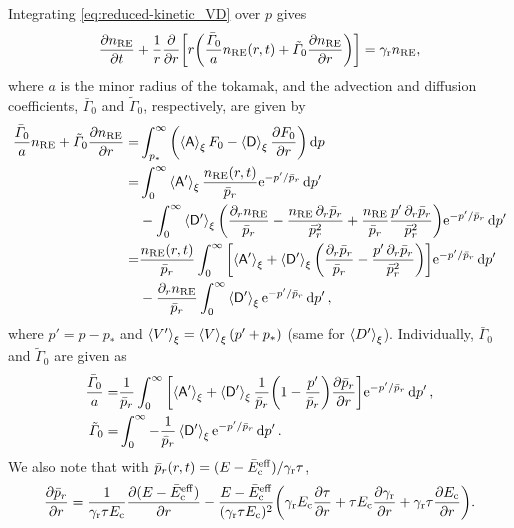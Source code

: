 \documentclass[11pt,a4paper,english
]{article}
\newcommand{\pd}{\ensuremath{\partial}}
\newcommand{\ee}{\mathrm{e}}
\newcommand{\nRE}{\ensuremath{n_{\rm RE}}}
\begin{document}
Integrating \eqref{eq:reduced-kinetic_VD} over $p$ gives
\begin{equation}\label{eq:n_RE}
\pdv{\nRE}{t} + \frac{1}{r}\pdv{r}
\qty[r\qty(\frac{\bar\varGamma_{0}}{a}\nRE(r,t)+\tilde\varGamma_{0}\pdv{\nRE}{r})]
=\gamma_{\rm r}\nRE,
\end{equation}
where $a$ is the minor radius of the tokamak, and the advection and
diffusion coefficients, $\bar\varGamma_{0}$ and $\tilde\varGamma_{0}$,
respectively, are given by
\begin{equation}
\begin{aligned}
\frac{\bar\varGamma_{0}}{a}\nRE+\tilde\varGamma_{0}\pdv{\nRE}{r}
=&\int_{p_*}^{\infty}\qty(\ev{\mathsf{A}}_{\xi}F_0-\ev{\mathsf{D}}_{\xi}\pdv{F_0}{r})\dd{p}\\
=&
\int_{0}^{\infty}\ev{\mathsf{A'}}_{\xi}\frac{\nRE(r,t)}{\bar{p}_r}\ee^{-p'/\bar{p}_r}\dd{p'}\\
&-\int_{0}^{\infty}\ev{\mathsf{D'}}_{\xi}
\qty(\frac{\pd_r\nRE}{\bar{p}_r}-\frac{\nRE\,\pd_r\bar{p}_r}{\bar{p}_r^2}
+\frac{\nRE}{\bar{p}_r}\frac{p'\,\pd_r\bar{p}_r}{\bar{p}_r^2})
\ee^{-p'/\bar{p}_r}\dd{p'}\\
=&\frac{\nRE(r,t)}{\bar{p}_r}
\int_{0}^{\infty}\qty[\ev{\mathsf{A'}}_{\xi} +\ev{\mathsf{D'}}_{\xi}
\qty(\frac{\pd_r\bar{p}_r}{\bar{p}_r}
-\frac{p'\,\pd_r\bar{p}_r}{\bar{p}_r^2})]
\ee^{-p'/\bar{p}_r}\dd{p'}\\
&-\frac{\pd_r\nRE}{\bar{p}_r}\int_{0}^{\infty}\ev{\mathsf{D'}}_{\xi}
\ee^{-p'/\bar{p}_r}\dd{p'},
\end{aligned}
\end{equation}
where $p'=p-p_{*}$ and $\ev{V'}_\xi=\ev{V}_\xi(p'+p_*)$ (same for
$\ev{D'}_\xi$). Individually,  $\bar\varGamma_{0}$ and
$\tilde\varGamma_{0}$ are given as
\begin{align}
\frac{\bar\varGamma_{0}}{a}
=&
\frac{1}{\bar{p}_r}
\int_{0}^{\infty}\qty[\ev{\mathsf{A'}}_{\xi} +\ev{\mathsf{D'}}_{\xi}
\frac{1}{\bar{p}_r}\qty(1-\frac{p'}{\bar{p}_r})\pdv{\bar{p}_r}{r}]
\ee^{-p'/\bar{p}_r}\dd{p'},
\\
\tilde\varGamma_{0}=&
\int_{0}^{\infty}-\frac{1}{\bar{p}_r}\ev{\mathsf{D'}}_{\xi}
\ee^{-p'/\bar{p}_r}\dd{p'}.
\end{align}
We also note that with %
$\bar{p}_r(r,t)=(E-\bar{E}_{\rm c}^{\rm eff})/\gamma_{\rm r}\tau$, %
\begin{equation}
\pdv{\bar{p}_r}{r}=
\frac{1}{\gamma_{\rm r}\tau E_{\rm c}}
\pdv{(E-\bar{E}_{\rm c}^{\rm eff})}{r}
-\frac{E-\bar{E}_{\rm c}^{\rm eff}}{(\gamma_{\rm r}\tau E_{\rm c})^2}
\qty(\gamma_{\rm r}E_{\rm c}\pdv{\tau}{r}
+\tau E_{\rm c}\pdv{\gamma_{\rm r}}{r}
+\gamma_{\rm r}\tau\pdv{E_{\rm c}}{r}).
\end{equation}
\end{document}
